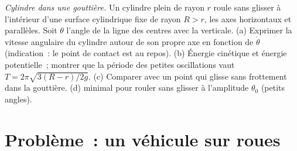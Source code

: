 \begin{exercise}[$\star\star\star$]\label{exo:b2:rigid-body-mechanics:12}
\emph{Cylindre dans une gouttière.} Un cylindre plein de rayon $r$ roule sans
glisser à l'intérieur d'une surface cylindrique fixe de rayon $R > r$, les axes
horizontaux et parallèles. Soit $\theta$ l'angle de la ligne des
centres avec la verticale. (a) Exprimer la vitesse angulaire du
cylindre autour de son propre axe en fonction de $\dot\theta$ (indication~: le point de contact
est au repos). (b) Énergie cinétique et énergie potentielle~; montrer que la
période des petites oscillations vaut $T = 2\pi\sqrt{3(R - r)/2g}$. (c) Comparer
avec un point qui glisse sans frottement dans la gouttière. (d) 
minimal pour rouler sans glisser à l'amplitude $\theta_0$
(petits angles).
\end{exercise}

\section{Problème~: un véhicule sur roues}

